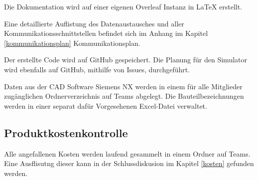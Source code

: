 Die Dokumentation wird auf einer eigenen Overleaf Instanz in LaTeX erstellt.

Eine detaillierte Auflistung des Datenaustausches und aller Kommunikationsschnittstellen befindet sich im Anhang im Kapitel \ref{kommunikationsplan} Kommunikationsplan.

Der erstellte Code wird auf GitHub gespeichert. Die Planung für den Simulator wird ebenfalls auf GitHub, mithilfe von Issues, durchgeführt. 

Daten aus der CAD Software Siemens NX werden in einem für alle Mitglieder zugänglichen Ordnerverzeichnis auf Teams abgelegt. Die Bauteilbezeichnungen werden in einer separat dafür Vorgesehenen Excel-Datei verwaltet. 

\subsection{Produktkostenkontrolle}

Alle angefallenen Kosten werden laufend gesammelt in einem Ordner auf Teams. Eine Ausflisutng dieser kann in der Schlussdiskusion im Kapitel \ref{kosten} gefunden werden.

